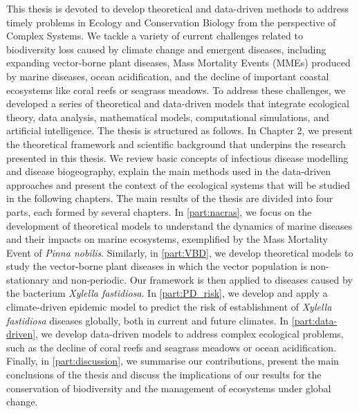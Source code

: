 This thesis is devoted to develop theoretical and data-driven methods to
address timely problems in Ecology and Conservation Biology from the
perspective of Complex Systems. We tackle a variety of current challenges
related to biodiversity loss caused by climate change and emergent diseases,
including expanding vector-borne plant diseases, Mass Mortality Events (MMEs)
produced by marine diseases, ocean acidification, and the decline of important
coastal ecosystems like coral reefs or seagrass meadows. To address these
challenges, we developed a series of theoretical and data-driven models that
integrate ecological theory, data analysis, mathematical models, computational
simulations, and artificial intelligence. The thesis is structured as follows.
In Chapter 2, we present the theoretical framework and scientific background
that underpins the research presented in this thesis. We review basic concepts
of infectious disease modelling and disease biogeography, explain the main
methods used in the data-driven approaches and present the context of the
ecological systems that will be studied in the following chapters. The main
results of the thesis are divided into four parts, each formed by several
chapters. In \cref{part:nacras}, we focus on the development of theoretical
models to understand the dynamics of marine diseases and their impacts on
marine ecosystems, exemplified by the Mass Mortality Event of \textit{Pinna
  nobilis}. Similarly, in \cref{part:VBD}, we develop theoretical models to
study the vector-borne plant diseases in which the vector population is
non-stationary and non-periodic. Our framework is then applied to diseases
caused by the bacterium \textit{Xylella fastidiosa}. In \cref{part:PD_risk}, we
develop and apply a climate-driven epidemic model to predict the risk of
establishment of \textit{Xylella fastidiosa} diseases globally, both in current
and future climates. In \cref{part:data-driven}, we develop data-driven models
to address complex ecological problems, such as the decline of coral reefs and
seagrass meadows or ocean acidification. Finally, in \cref{part:discussion}, we
summarise our contributions, present the main conclusions of the thesis and
discuss the implications of our results for the conservation of biodiversity
and the management of ecosystems under global change.